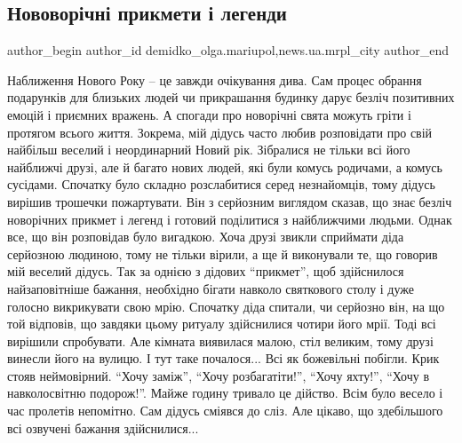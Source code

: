  
 
 
 
 
 
\subsection{Нововорічні прикмети і легенди}
\label{sec:30_12_2019.stz.news.ua.mrpl_city.1.novorichni_prykmety_legendy}
 
\ifcmt
 author_begin
   author_id demidko_olga.mariupol,news.ua.mrpl_city
 author_end
\fi

Наближення Нового Року – це завжди очікування дива. Сам процес обрання
подарунків для близьких людей чи прикрашання будинку дарує безліч позитивних
емоцій і приємних вражень. А спогади про новорічні свята можуть гріти і
протягом всього життя. Зокрема, мій дідусь часто любив розповідати про свій
найбільш веселий і неординарний Новий рік. Зібралися не тільки всі його
найближчі друзі, але й багато нових людей, які були комусь родичами, а комусь
сусідами. Спочатку було складно розслабитися серед незнайомців, тому дідусь
вирішив трошечки пожартувати. Він з серйозним виглядом сказав, що знає безліч
новорічних прикмет і легенд і готовий поділитися з найближчими людьми. Однак
все, що він розповідав було вигадкою. Хоча друзі звикли сприймати діда
серйозною людиною, тому не тільки вірили, а ще й виконували те, що говорив мій
веселий дідусь. Так за однією з дідових \enquote{прикмет}, щоб здійснилося
найзаповітніше бажання, необхідно бігати навколо святкового столу і дуже
голосно викрикувати свою мрію. Спочатку діда спитали, чи серйозно він, на що
той відповів, що завдяки цьому ритуалу здійснилися чотири його мрії. Тоді всі
вирішили спробувати. Але кімната виявилася малою, стіл великим, тому друзі
винесли його на вулицю. І тут таке почалося... Всі як божевільні побігли. Крик
стояв неймовірний. \enquote{Хочу заміж}, \enquote{Хочу розбагатіти!},
\enquote{Хочу яхту!}, \enquote{Хочу в навколосвітню подорож!}. Майже годину
тривало це дійство. Всім було весело і час пролетів непомітно. Сам дідусь
сміявся до сліз. Але цікаво, що здебільшого всі озвучені бажання здійснилися...

